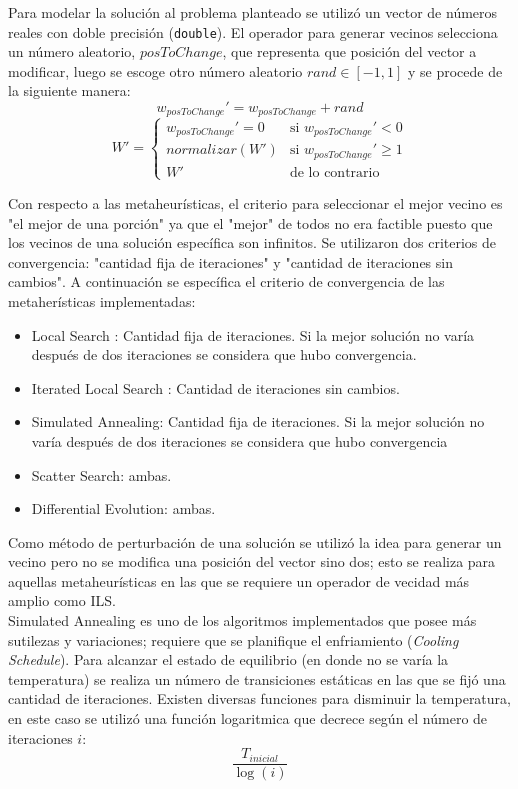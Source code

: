 \documentclass{ci5652}
\begin{document}
Para modelar la solución al problema planteado se utilizó un vector de números
reales con doble precisión (\texttt{double}). El operador para generar vecinos
selecciona un número aleatorio, $posToChange$, que representa que posición del
vector  a modificar, luego se escoge otro número aleatorio $rand \in [-1, 1]$
y se procede de la siguiente manera:
$$w_{posToChange}' =  w_{posToChange} + rand$$
\[
  W' =
  \begin{cases}
    w_{posToChange}' = 0 & \text{si } w_{posToChange}' < 0\\
    normalizar(W')       & \text{si } w_{posToChange}' \geq 1\\
    W'                   & \text{de lo contrario}
  \end{cases}
\]

Con respecto a las metaheurísticas, el criterio para seleccionar el mejor vecino
es "el mejor de una porción" ya que el "mejor" de todos no era factible puesto
que los vecinos de una solución específica son infinitos. Se utilizaron dos
criterios de convergencia: "cantidad fija de iteraciones" y "cantidad de
iteraciones sin cambios". A continuación se específica el criterio de
convergencia de las metaherísticas implementadas:

\begin{itemize}
  \item Local Search : Cantidad fija de iteraciones. Si la mejor solución no
  varía después de dos iteraciones se considera que hubo convergencia.
  \item Iterated Local Search : Cantidad de iteraciones sin cambios.
  \item Simulated Annealing: Cantidad fija de iteraciones. Si la mejor solución
  no varía después de dos iteraciones se considera que hubo convergencia
  \item Scatter Search: ambas.
  \item Differential Evolution: ambas.
\end{itemize}

Como método de perturbación de una solución se utilizó la idea para generar un
vecino pero no se modifica una posición del vector sino dos; esto se realiza
para aquellas metaheurísticas en las que se requiere un operador de vecidad
más amplio como ILS.\\

Simulated Annealing es uno de los algoritmos implementados que posee más
sutilezas y variaciones; requiere que se planifique el enfriamiento
(\textit{Cooling Schedule}). Para alcanzar el estado de equilibrio (en donde no
se varía la temperatura) se realiza un número de transiciones estáticas en las
que se fijó una cantidad de iteraciones. Existen diversas funciones para
disminuir la temperatura, en este caso se utilizó una función logaritmica que
decrece según el número de iteraciones $i$: $$\frac{T_{inicial}}{\log(i)}$$
\end{document}
